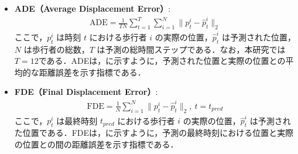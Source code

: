 \begin{itemize}
  \item \textbf{ADE（Average Displacement Error）}\cite{pellegrini2009you-eth}:
    \begin{align}
      \text{ADE} = \frac{1}{TN} \sum_{t=1}^{T} \sum_{i=1}^{N} \| p^i_t - \hat{p}^i_t \|_2
    \end{align}
    ここで，$p^i_t$ は時刻 $t$ における歩行者 $i$ の実際の位置，$\hat{p}^i_t$ は予測された位置，$N$ は歩行者の総数，$T$ は予測の総時間ステップである．なお，本研究では$T = 12$である．ADEは，に示すように，予測された位置と実際の位置との平均的な距離誤差を示す指標である．
    \\
    \item \textbf{FDE（Final Displacement Error）}\cite{s-lstm}:
    \begin{align}
      \text{FDE} = \frac{1}{N} \sum_{i=1}^{N} \| p^i_t - \hat{p}^i_t \|_2 , \ t = t_{pred}
    \end{align}
    ここで，$p^i_t$ は最終時刻 $t_{pred}$ における歩行者 $i$ の実際の位置，$\hat{p}^i_t$ は予測された位置である．FDEは，に示すように，予測の最終時刻における位置と実際の位置との間の距離誤差を示す指標である．
\end{itemize}

